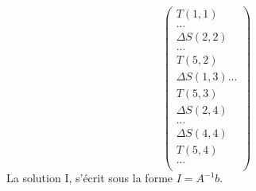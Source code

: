 \begin{equation}
\begin{pmatrix}
T(1,1)\\
...\\
\Delta S(2,2)\\
...\\
T(5,2)\\
\Delta S(1,3)
...\\
T(5,3)\\
\Delta S(2,4)\\
...\\
\Delta S(4,4)\\
T(5,4)\\
...\\
\end{pmatrix}
\end{equation}
La solution I, s'écrit sous la forme $I = A^{-1}b$.

